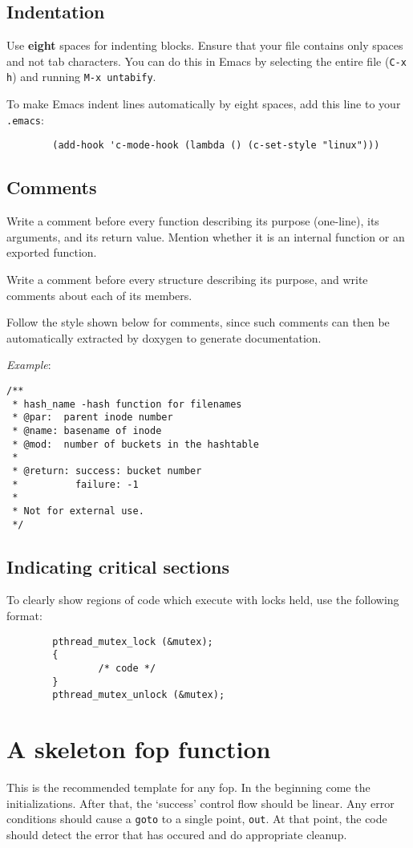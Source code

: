 \documentclass{article}[12pt]
\begin{document}
\subsection*{Indentation}
Use \textbf{eight} spaces for indenting blocks. Ensure that your
file contains only spaces and not tab characters. You can do this
in Emacs by selecting the entire file (\texttt{C-x h}) and
running \texttt{M-x untabify}.

To make Emacs indent lines automatically by eight spaces, add this
line to your \texttt{.emacs}:

\begin{verbatim}
        (add-hook 'c-mode-hook (lambda () (c-set-style "linux")))
\end{verbatim}

\subsection*{Comments}
Write a comment before every function describing its purpose (one-line),
its arguments, and its return value. Mention whether it is an internal
function or an exported function.

Write a comment before every structure describing its purpose, and
write comments about each of its members.

Follow the style shown below for comments, since such comments
can then be automatically extracted by doxygen to generate
documentation.

\textsl{Example}:
\begin{verbatim}
/**
 * hash_name -hash function for filenames
 * @par:  parent inode number
 * @name: basename of inode
 * @mod:  number of buckets in the hashtable
 *
 * @return: success: bucket number
 *          failure: -1
 *
 * Not for external use.
 */
\end{verbatim}

\subsection*{Indicating critical sections}
To clearly show regions of code which execute with locks held, use 
the following format:

\begin{verbatim}
        pthread_mutex_lock (&mutex);
        {
                /* code */
        }
        pthread_mutex_unlock (&mutex);
\end{verbatim}

\section*{A skeleton fop function}
This is the recommended template for any fop. In the beginning come
the initializations. After that, the `success' control flow should be
linear.  Any error conditions should cause a \texttt{goto} to a single
point, \texttt{out}.  At that point, the code should detect the error
that has occured and do appropriate cleanup.
\end{document}

